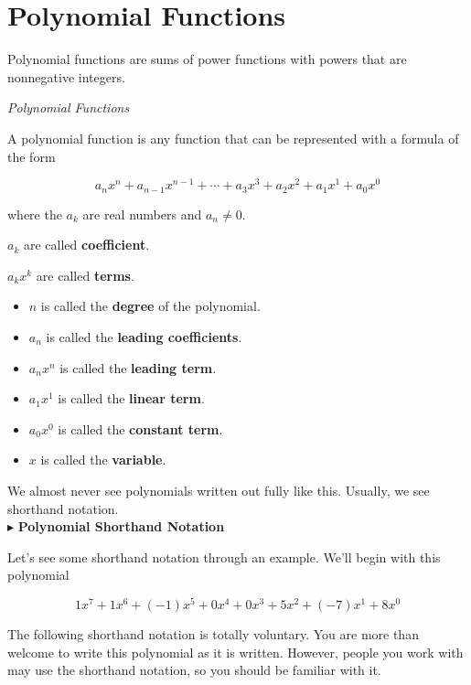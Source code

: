 \documentclass{ximera}
\begin{document}
\section{Polynomial Functions}


Polynomial functions are sums of power functions with powers that are nonnegative integers.


\begin{definition} \textit{Polynomial Functions}

A polynomial function is any function that can be represented with a formula of the form

\[    a_n x^n + a_{n-1} x^{n-1} + \cdots + a_3 x^3 + a_2 x^2 + a_1 x^1 + a_0 x^0      \]

where the $a_k$ are real numbers and $a_n \ne 0$.

$a_k$ are called \textbf{coefficient}.

$a_k x^k$ are called \textbf{terms}.



\begin{itemize}
\item $n$ is called the \textbf{degree} of the polynomial.
\item $a_n$ is called the \textbf{leading coefficients}.
\item $a_n x^n$ is called the \textbf{leading term}.
\item $a_1 x^1$ is called the \textbf{linear term}.
\item $a_0 x^0$ is called the \textbf{constant term}.
\item $x$ is called the \textbf{variable}.
\end{itemize}


\end{definition}
We almost never see polynomials written out fully like this.  Usually, we see shorthand notation.   \\



$\blacktriangleright$ \textbf{Polynomial Shorthand Notation}


Let's see some shorthand notation through an example.  We'll begin with this polynomial


\[  1 x^7 + 1 x^6 + (-1) x^5 + 0 x^4 + 0 x^3 + 5 x^2 + (-7) x^1 + 8 x^0              \]



The following shorthand notation is totally voluntary.  You are more than welcome to write this polynomial as it is written. However, people you work with may use the shorthand notation, so you should be familiar with it.
\end{document}

